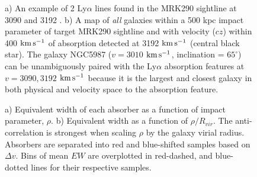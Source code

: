 \documentclass[iop]{emulateapj-rtx4}
\begin{document}
\begin{figure}[t!]
  \caption{\small{a) An example of 2 Ly$\alpha$ lines found in the MRK290 sightline at 3090 and 3192 . b) A map of \textit{all} galaxies within a 500 kpc impact parameter of target MRK290 sightline and with velocity ($cz$) within 400 $\rm km\, s^{-1}$ of absorption detected at 3192 $\rm km\, s^{-1}$ (central black star). The galaxy NGC5987 ($v=3010$ $\rm km\, s^{-1}$, inclination = $65^{\circ}$) can be unambiguously paired with the Ly$\alpha$ absorption features at $v=3090, 3192$ $\rm km\, s^{-1}$ because it is the largest and closest galaxy in both physical and velocity space to the absorption feature.}}
\vspace{5pt}
\end{figure}

\begin{figure}[t]
\centering
{}
\caption{\small{a) Equivalent width of each absorber as a function of impact parameter, $\rho$. b) Equivalent width as a function of $\rho/R_{vir}$. The anti-correlation is strongest when scaling $\rho$ by the galaxy virial radius. Absorbers are separated into red and blue-shifted samples based on $\Delta v$. Bins of mean $EW$ are overplotted in red-dashed, and blue-dotted lines for their respective samples.}}
\vspace{5pt}
\end{figure}
\end{document}
